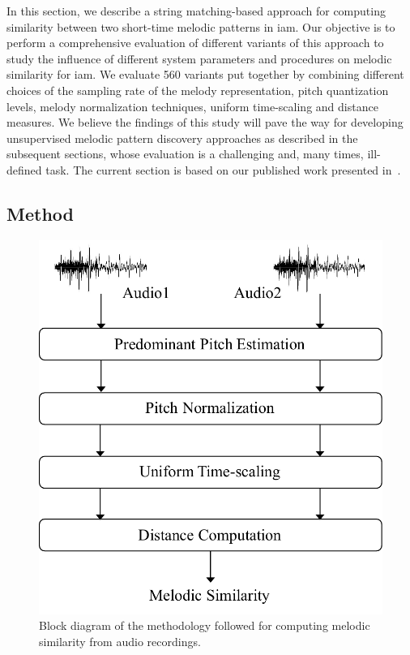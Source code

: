 

In this section, we describe a string matching-based approach for computing similarity between two short-time melodic patterns in \gls{iam}. Our objective is to perform a comprehensive evaluation of different variants of this approach to study the influence of different system parameters and procedures on melodic similarity for \gls{iam}. We evaluate 560 variants put together by combining different choices of the sampling rate of the melody representation, pitch quantization levels, melody normalization techniques, uniform time-scaling and distance measures. We believe the findings of this study will pave the way for developing unsupervised melodic pattern discovery approaches as described in the subsequent sections, whose evaluation is a challenging and, many times, ill-defined task. The current section is based on our published work presented in~\cite{gulati_ICASSP2015}.

\subsection{Method}
\label{sec:method_similarity_evaluation}


\begin{figure}
	\begin{center}
		\includegraphics[width=\figSizeSixty]{ch06_patterns/figures/SimilarityEvaluation/melodic_similarity_blockd.pdf}
	\end{center}
	\caption[Block diagram for computing melodic similarity]{Block diagram of the methodology followed for computing melodic similarity from audio recordings.}
	\label{fig:block_diagram_melodic_similarity}
\end{figure}

